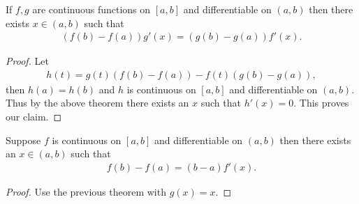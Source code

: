 \begin{theorem}
  If $f,g$ are continuous functions on $[a,b]$ and differentiable on $(a,b)$ then there exists $x\in (a,b)$ such that
  \begin{align*}
    (f(b) - f(a))g'(x) = (g(b) - g(a)) f'(x).
  \end{align*}
\end{theorem}
\begin{proof}
  Let
  \begin{align*}
    h(t) = g(t)(f(b) - f(a)) - f(t)(g(b) - g(a)),
  \end{align*}
  then $h(a) = h(b)$ and $h$ is continuous on $[a,b]$ and differentiable on $(a,b)$. Thus by the above theorem there exists an $x$ such that $h'(x) = 0$. This proves our claim.
\end{proof}
\begin{theorem}
  Suppose $f$ is continuous on $[a,b]$ and differentiable on $(a,b)$ then there exists an $x\in (a,b)$ such that
  \begin{align*}
    f(b) - f(a) = (b-a) f'(x).
  \end{align*}
\end{theorem}
\begin{proof}
  Use the previous theorem with $g(x) = x$.
\end{proof}
